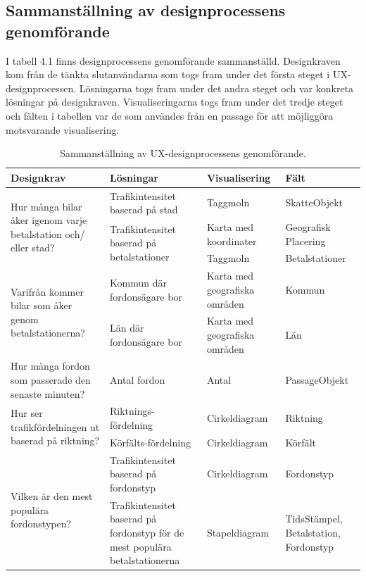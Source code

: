 \documentclass[12pt]{kththesis}
\begin{document}
\subsection{Sammanställning av designprocessens genomförande}
I tabell 4.1 finns designprocessens genomförande sammanställd. Designkraven kom från de tänkta slutanvändarna som togs fram under det första steget i UX-designprocessen. Lösningarna togs fram under det andra steget och var konkreta lösningar på designkraven. Visualiseringarna togs fram under det tredje steget och fälten i tabellen var de som användes från en passage för att möjliggöra motsvarande visualisering.

\begin{table}[h!]
  \begin{center}
  \caption{Sammanställning av UX-designprocessens genomförande.}
    \label{tab:table1}
 \begin{tabular}{|p{3cm}|p{3cm}|p{3cm}|p{3cm}|}
      \hline
     \textbf{Designkrav} & \textbf{Lösningar} & \textbf{Visualisering} & \textbf{Fält}\\
     \hline
  \multirow{3}{3cm}{Hur många bilar åker igenom varje betalstation och/ eller stad?} &  Trafikintensitet baserad på stad & Taggmoln  & SkatteObjekt\\\cline{2-4}
  & \multirow{2}{3cm}{Trafikintensitet baserad på betalstationer} & Karta med koordinater
& Geografisk Placering\\\cline{3-4}  
  & &  Taggmoln
& Betalstationer \\ \hline


  \multirow{2}{3cm}{Varifrån kommer bilar som åker genom betalstationerna?} &  Kommun där fordonsägare bor & Karta med geografiska områden  & Kommun\\\cline{2-4}
  &Län där fordonsägare bor
 & Karta med geografiska områden  & Län\\ \hline
 
Hur många fordon som passerade den senaste minuten? &Antal fordon
 & Antal  & PassageObjekt\\ \hline
 
 \multirow{2}{3cm}{Hur ser trafikfördelningen ut baserad på riktning?} &  Riktnings-fördelning&Cirkeldiagram& Riktning\\\cline{2-4}
  &Körfälts-fördelning 
 & Cirkeldiagram  & Körfält\\ \hline
 
 \multirow{2}{3cm}{Vilken är den mest populära fordonstypen?} &  Trafikintensitet baserad på fordonstyp & Cirkeldiagram& Fordonstyp\\\cline{2-4}
  &Trafikintensitet baserad på fordonstyp för de mest populära betalstationerna 
 & Stapeldiagram  & TidsStämpel, Betalstation, Fordonstyp\\ \hline

\end{tabular}
\end{center}
\end{table}
\end{document}
